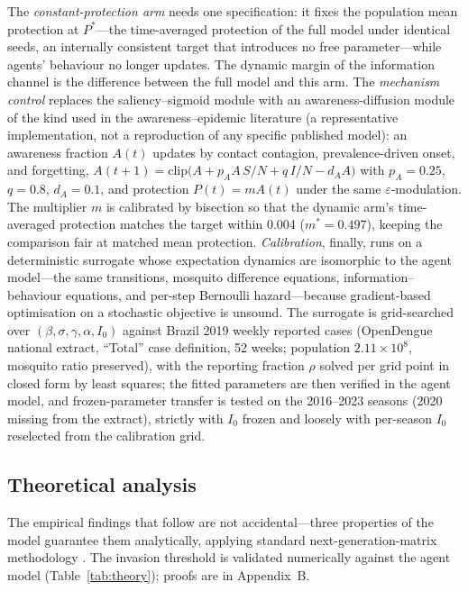 \documentclass[]{interact}
\begin{document}
The \emph{constant-protection arm} needs one specification: it fixes the population mean protection at $P^{*}$---the time-averaged protection of the full model under identical seeds, an internally consistent target that introduces no free parameter---while agents' behaviour no longer updates. The dynamic margin of the information channel is the difference between the full model and this arm. The \emph{mechanism control} replaces the saliency--sigmoid module with an awareness-diffusion module of the kind used in the awareness--epidemic literature (a representative implementation, not a reproduction of any specific published model): an awareness fraction $A(t)$ updates by contact contagion, prevalence-driven onset, and forgetting, $A(t{+}1)=\mathrm{clip}\big(A + p_A A\,S/N + q\,I/N - d_A A\big)$ with $p_A{=}0.25$, $q{=}0.8$, $d_A{=}0.1$, and protection $P(t)=mA(t)$ under the same $\varepsilon$-modulation. The multiplier $m$ is calibrated by bisection so that the dynamic arm's time-averaged protection matches the target within 0.004 ($m^{*}{=}0.497$), keeping the comparison fair at matched mean protection. \emph{Calibration}, finally, runs on a deterministic surrogate whose expectation dynamics are isomorphic to the agent model---the same transitions, mosquito difference equations, information--behaviour equations, and per-step Bernoulli hazard---because gradient-based optimisation on a stochastic objective is unsound. The surrogate is grid-searched over $(\beta,\sigma,\gamma,\alpha,I_0)$ against Brazil 2019 weekly reported cases (OpenDengue national extract, ``Total'' case definition, 52 weeks; population $2.11\times 10^{8}$, mosquito ratio preserved), with the reporting fraction $\rho$ solved per grid point in closed form by least squares; the fitted parameters are then verified in the agent model, and frozen-parameter transfer is tested on the 2016--2023 seasons (2020 missing from the extract), strictly with $I_0$ frozen and loosely with per-season $I_0$ reselected from the calibration grid.

\subsection{Theoretical analysis}

The empirical findings that follow are not accidental---three properties of the model guarantee them analytically, applying standard next-generation-matrix methodology \cite{diekmann1990definition,vandendriessche2002reproduction}. The invasion threshold is validated numerically against the agent model (Table~\ref{tab:theory}); proofs are in Appendix~B.
\end{document}
